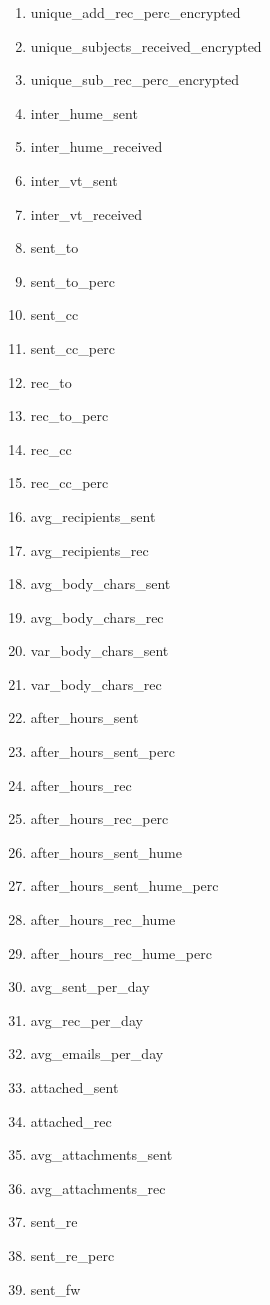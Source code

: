 \documentclass[12pt]{report}
\begin{document}
\begin{enumerate}
	\item unique\_add\_rec\_perc\_encrypted
	\item unique\_subjects\_received\_encrypted
	\item unique\_sub\_rec\_perc\_encrypted
	\item inter\_hume\_sent
	\item inter\_hume\_received
	\item inter\_vt\_sent
	\item inter\_vt\_received
	\item sent\_to
	\item sent\_to\_perc
	\item sent\_cc
	\item sent\_cc\_perc
	\item rec\_to
	\item rec\_to\_perc
	\item rec\_cc
	\item rec\_cc\_perc
	\item avg\_recipients\_sent
	\item avg\_recipients\_rec
	\item avg\_body\_chars\_sent
	\item avg\_body\_chars\_rec
	\item var\_body\_chars\_sent
	\item var\_body\_chars\_rec
	\item after\_hours\_sent
	\item after\_hours\_sent\_perc
	\item after\_hours\_rec
	\item after\_hours\_rec\_perc
	\item after\_hours\_sent\_hume
	\item after\_hours\_sent\_hume\_perc
	\item after\_hours\_rec\_hume
	\item after\_hours\_rec\_hume\_perc
	\item avg\_sent\_per\_day
	\item avg\_rec\_per\_day
	\item avg\_emails\_per\_day
	\item attached\_sent
	\item attached\_rec
	\item avg\_attachments\_sent
	\item avg\_attachments\_rec
	\item sent\_re
	\item sent\_re\_perc
	\item sent\_fw

\end{enumerate}
\end{document}

